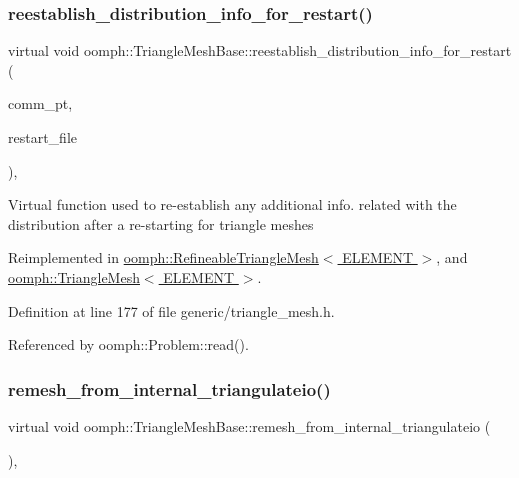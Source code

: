 \subsubsection{\texorpdfstring{reestablish\+\_\+distribution\+\_\+info\+\_\+for\+\_\+restart()}{reestablish\_distribution\_info\_for\_restart()}}
{\footnotesize\ttfamily virtual void oomph\+::\+Triangle\+Mesh\+Base\+::reestablish\+\_\+distribution\+\_\+info\+\_\+for\+\_\+restart (\begin{DoxyParamCaption}\item[{\hyperlink{classoomph_1_1OomphCommunicator}{Oomph\+Communicator} $\ast$}]{comm\+\_\+pt,  }\item[{std\+::istream \&}]{restart\+\_\+file }\end{DoxyParamCaption})\hspace{0.3cm}{\ttfamily [inline]}, {\ttfamily [virtual]}}

Virtual function used to re-\/establish any additional info. related with the distribution after a re-\/starting for triangle meshes 

Reimplemented in \hyperlink{classoomph_1_1RefineableTriangleMesh_a3ecdb3b15c3fefbc96f407c4fdf5b155}{oomph\+::\+Refineable\+Triangle\+Mesh$<$ E\+L\+E\+M\+E\+N\+T $>$}, and \hyperlink{classoomph_1_1TriangleMesh_aa4b1cfd4537c1e511fe1f2fb14b1e8a6}{oomph\+::\+Triangle\+Mesh$<$ E\+L\+E\+M\+E\+N\+T $>$}.



Definition at line 177 of file generic/triangle\+\_\+mesh.\+h.



Referenced by oomph\+::\+Problem\+::read().

\mbox{\label{classoomph_1_1TriangleMeshBase_a2e7f54673e522b9be0543f0256afd04b}} 
\subsubsection{\texorpdfstring{remesh\+\_\+from\+\_\+internal\+\_\+triangulateio()}{remesh\_from\_internal\_triangulateio()}}
{\footnotesize\ttfamily virtual void oomph\+::\+Triangle\+Mesh\+Base\+::remesh\+\_\+from\+\_\+internal\+\_\+triangulateio (\begin{DoxyParamCaption}{ }\end{DoxyParamCaption})\hspace{0.3cm}{\ttfamily [inline]}, {\ttfamily [virtual]}}



